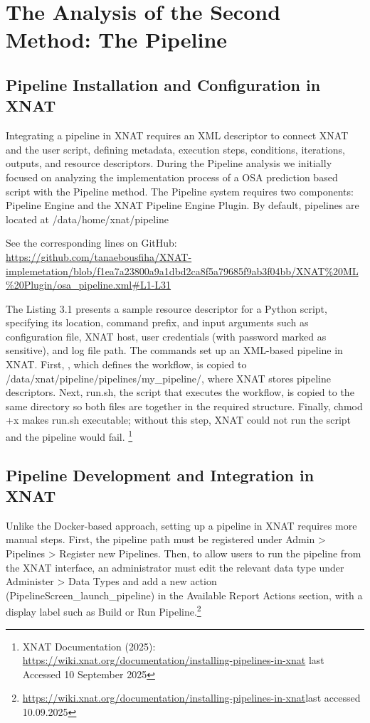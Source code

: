 \chapter{The Analysis of the Second Method: The Pipeline}
\section{Pipeline Installation and Configuration in XNAT}

Integrating a pipeline in XNAT requires an \ac{XML} descriptor to connect XNAT and the user script, defining metadata, execution steps, conditions, iterations, outputs, and resource descriptors.
During the Pipeline analysis we initially focused on analyzing the implementation process of a OSA prediction based script with the Pipeline method. The Pipeline system requires two components: Pipeline Engine and the XNAT Pipeline Engine Plugin. By default, pipelines are located at /data/home/xnat/pipeline





\noindent\footnotesize See the corresponding lines on GitHub:\url{ https://github.com/tanaebousfiha/XNAT-implemetation/blob/f1ea7a23800a9a1dbd2ca8f5a79685f9ab3f04bb/XNAT%20ML%20Plugin/osa_pipeline.xml#L1-L31}


The  Listing 3.1 presents a sample resource descriptor for a Python script, specifying its location, command prefix, and input arguments such as configuration file, XNAT host, user credentials (with password marked as sensitive), and log file path. 
The commands set up an XML-based pipeline in XNAT. First, , which defines the workflow, is copied to /data/xnat/pipeline/pipelines/my\_pipeline/, where XNAT stores pipeline descriptors. Next, run.sh, the script that executes the workflow, is copied to the same directory so both files are together in the required structure. Finally, chmod +x makes run.sh executable; without this step, XNAT could not run the script and the pipeline would fail.
\footnote{XNAT Documentation (2025): \url{https://wiki.xnat.org/documentation/installing-pipelines-in-xnat} last Accessed 10 September 2025}

\section{Pipeline Development and Integration in XNAT}
Unlike the Docker-based approach, setting up a pipeline in XNAT requires more manual steps. First, the pipeline path must be registered under Admin > Pipelines > Register new Pipelines. Then, to allow users to run the pipeline from the XNAT interface, an administrator must edit the relevant data type under Administer > Data Types and add a new action (PipelineScreen\_launch\_pipeline) in the Available Report Actions section, with a display label such as Build or Run Pipeline.\footnote{\url{https://wiki.xnat.org/documentation/installing-pipelines-in-xnat}last accessed 10.09.2025}

